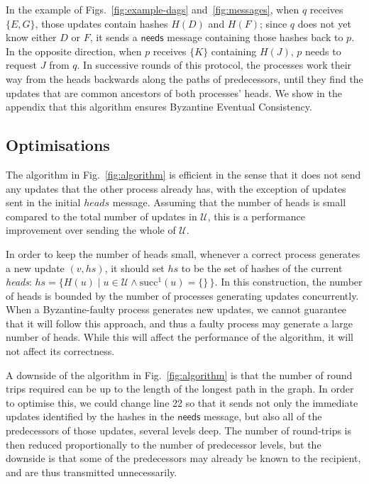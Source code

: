 \documentclass[manuscript,anonymous]{acmart}
\begin{document}
In the example of Figs.~\ref{fig:example-dags} and~\ref{fig:messages}, when $q$ receives $\{E, G\}$, those updates contain hashes $H(D)$ and $H(F)$; since $q$ does not yet know either $D$ or $F$, it sends a $\mathsf{needs}$ message containing those hashes back to $p$.
In the opposite direction, when $p$ receives $\{K\}$ containing $H(J)$, $p$ needs to request $J$ from $q$.
In successive rounds of this protocol, the processes work their way from the heads backwards along the paths of predecessors, until they find the updates that are common ancestors of both processes' heads.
We show in the appendix that this algorithm ensures Byzantine Eventual Consistency.

\subsection{Optimisations}\label{sec:optimisations}

The algorithm in Fig.~\ref{fig:algorithm} is efficient in the sense that it does not send any updates that the other process already has, with the exception of updates sent in the initial $\mathit{heads}$ message.
Assuming that the number of heads is small compared to the total number of updates in $\mathcal{U}$, this is a performance improvement over sending the whole of $\mathcal{U}$.

In order to keep the number of heads small, whenever a correct process generates a new update $(v, \mathit{hs})$, it should set $\mathit{hs}$ to be the set of hashes of the current \emph{heads}:
$\mathit{hs} = \{H(u) \mid u \in \mathcal{U} \wedge \mathrm{succ}^1(u) = \{\}\,\}$.
In this construction, the number of heads is bounded by the number of processes generating updates concurrently.
When a Byzantine-faulty process generates new updates, we cannot guarantee that it will follow this approach, and thus a faulty process may generate a large number of heads.
While this will affect the performance of the algorithm, it will not affect its correctness.

A downside of the algorithm in Fig.~\ref{fig:algorithm} is that the number of round trips required can be up to the length of the longest path in the graph.
In order to optimise this, we could change line 22 so that it sends not only the immediate updates identified by the hashes in the $\mathsf{needs}$ message, but also all of the predecessors of those updates, several levels deep.
The number of round-trips is then reduced proportionally to the number of predecessor levels, but the downside is that some of the predecessors may already be known to the recipient, and are thus transmitted unnecessarily.
\end{document}
